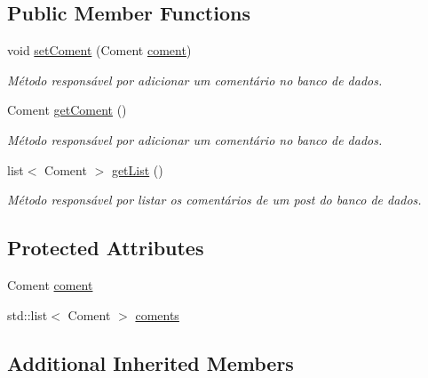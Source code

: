 \subsection*{Public Member Functions}
\begin{DoxyCompactItemize}
\item 
void \hyperlink{class_coment_command_a7dcbcf61c4dcbb080881535ba1093711}{set\-Coment} (Coment \hyperlink{class_coment_command_aeeadc825656bf9e76ce0ea3f721749e0}{coment})
\begin{DoxyCompactList}\small\item\em Método responsável por adicionar um comentário no banco de dados. \end{DoxyCompactList}\item 
\hypertarget{class_coment_command_a4ce5a7ad5abb44fbe6951dd10c576f67}{Coment \hyperlink{class_coment_command_a4ce5a7ad5abb44fbe6951dd10c576f67}{get\-Coment} ()}\label{class_coment_command_a4ce5a7ad5abb44fbe6951dd10c576f67}

\begin{DoxyCompactList}\small\item\em Método responsável por adicionar um comentário no banco de dados. \end{DoxyCompactList}\item 
\hypertarget{class_coment_command_a2e31acac5682b142fdff5dc5ebee7e93}{list$<$ Coment $>$ \hyperlink{class_coment_command_a2e31acac5682b142fdff5dc5ebee7e93}{get\-List} ()}\label{class_coment_command_a2e31acac5682b142fdff5dc5ebee7e93}

\begin{DoxyCompactList}\small\item\em Método responsável por listar os comentários de um post do banco de dados. \end{DoxyCompactList}\end{DoxyCompactItemize}
\subsection*{Protected Attributes}
\begin{DoxyCompactItemize}
\item 
Coment \hyperlink{class_coment_command_aeeadc825656bf9e76ce0ea3f721749e0}{coment}
\item 
std\-::list$<$ Coment $>$ \hyperlink{class_coment_command_ad0ae90b7aacb5dc53857351855845488}{coments}
\end{DoxyCompactItemize}
\subsection*{Additional Inherited Members}


